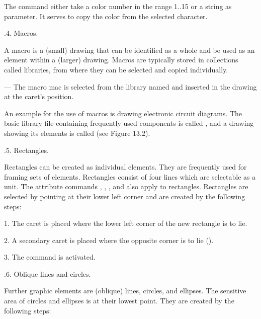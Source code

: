 
The  command either take a color number in the range 1..15 or a string as parameter. It serves to copy the color from the selected character.

.4. Macros.

A macro is a (small) drawing that can be identified as a whole and be used as an element within a (larger) drawing. Macros are typically stored in collections called libraries, from where they can be selected and copied individually.

 --- The macro mac is selected from the library named  and inserted in the drawing at the caret's position.

An example for the use of macros is drawing electronic circuit diagrams. The basic library file containing frequently used  components is called , and a drawing showing its elements is called  (see Figure 13.2).


.5. Rectangles.

Rectangles can be created as individual elements. They are frequently used for framing sets of elements. Rectangles consist of four lines which are selectable as a unit. The attribute commands , , , and  also apply to rectangles. Rectangles are selected by pointing at their lower left corner and are created by the following steps:

\item{1.} The caret is placed where the lower left corner of the new rectangle is to lie.
\item{2.} A secondary caret is placed where the opposite corner is to lie ().
\item{3.} The command  is activated.

.6. Oblique lines and circles.

Further graphic elements are (oblique) lines, circles, and ellipses. The sensitive area of circles and ellipses is at their lowest point. They are created by the following steps:

